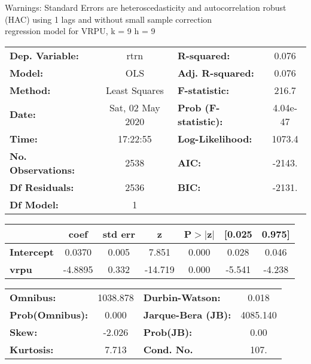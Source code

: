 Warnings: \newline
 [1] Standard Errors are heteroscedasticity and autocorrelation robust (HAC) using 1 lags and without small sample correction\\ 

regression model for VRPU, k = 9 h = 9\begin{center}
\begin{tabular}{lclc}
\toprule
\textbf{Dep. Variable:}    &       rtrn       & \textbf{  R-squared:         } &     0.076   \\
\textbf{Model:}            &       OLS        & \textbf{  Adj. R-squared:    } &     0.076   \\
\textbf{Method:}           &  Least Squares   & \textbf{  F-statistic:       } &     216.7   \\
\textbf{Date:}             & Sat, 02 May 2020 & \textbf{  Prob (F-statistic):} &  4.04e-47   \\
\textbf{Time:}             &     17:22:55     & \textbf{  Log-Likelihood:    } &    1073.4   \\
\textbf{No. Observations:} &        2538      & \textbf{  AIC:               } &    -2143.   \\
\textbf{Df Residuals:}     &        2536      & \textbf{  BIC:               } &    -2131.   \\
\textbf{Df Model:}         &           1      & \textbf{                     } &             \\
\bottomrule
\end{tabular}
\begin{tabular}{lcccccc}
                   & \textbf{coef} & \textbf{std err} & \textbf{z} & \textbf{P$> |$z$|$} & \textbf{[0.025} & \textbf{0.975]}  \\
\midrule
\textbf{Intercept} &       0.0370  &        0.005     &     7.851  &         0.000        &        0.028    &        0.046     \\
\textbf{vrpu}      &      -4.8895  &        0.332     &   -14.719  &         0.000        &       -5.541    &       -4.238     \\
\bottomrule
\end{tabular}
\begin{tabular}{lclc}
\textbf{Omnibus:}       & 1038.878 & \textbf{  Durbin-Watson:     } &    0.018  \\
\textbf{Prob(Omnibus):} &   0.000  & \textbf{  Jarque-Bera (JB):  } & 4085.140  \\
\textbf{Skew:}          &  -2.026  & \textbf{  Prob(JB):          } &     0.00  \\
\textbf{Kurtosis:}      &   7.713  & \textbf{  Cond. No.          } &     107.  \\
\bottomrule
\end{tabular}
\end{center}

